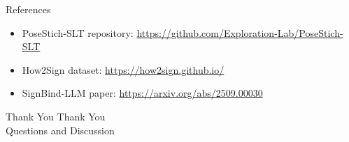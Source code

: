 \documentclass[aspectratio=169]{beamer}
\begin{document}
\begin{frame}{References}
\small
\begin{itemize}
  \item PoseStich-SLT repository: \url{https://github.com/Exploration-Lab/PoseStich-SLT}
  \item How2Sign dataset: \url{https://how2sign.github.io/}
  \item SignBind-LLM paper: \url{https://arxiv.org/abs/2509.00030}
\end{itemize}
\end{frame}

\begin{frame}{Thank You}
\centering
\Large Thank You\\[1em]
\normalsize Questions and Discussion
\end{frame}
\end{document}
